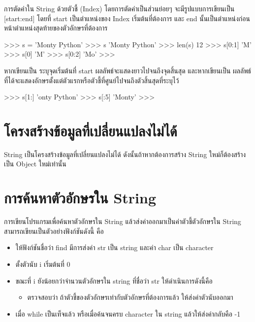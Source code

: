 การตัดคำใน String ด้วยตัวชี้ (Index) โดยการตัดคำเป็นส่วนย่อยๆ จะมีรูปแบบการเขียนเป็น [start:end] โดยที่ start เป็นตำแหน่งของ Index เริ่มต้นที่ต้องการ และ end นั้นเป็นตำแหน่งก่อนหน้าตำแหน่งสุดท้ายของตัวอักษรที่ต้องการ

\begin{codelist}{}{}
>>> s = 'Monty Python'
>>> s
'Monty Python'
>>> len(s)
12
>>> s[0:1]
'M'
>>> s[0]
'M'
>>> s[0:2]
'Mo'
>>>
\end{codelist}


หากเขียนเป็น  \pyinline{[start:]} ระบุจุดเริ่มต้นที่ start ผลลัพธ์จะแสดงยาวไปจนถึงจุดสิ้นสุด และหากเขียนเป็น  \pyinline{[:end]} ผลลัพธ์ที่ได้จะแสดงอักษรตั้งแต่ตัวแรกหรือตัวชี้ที่ศูนย์ไปจนถึงตัวสิ้นสุดที่ระบุไว้

\begin{codelist}{}{}
>>> s[1:]
'onty Python'
>>> s[:5]
'Monty'
>>>
\end{codelist}


\section{โครงสร้างข้อมูลที่เปลี่ยนแปลงไม่ได้}

String เป็นโครงสร้างข้อมูลที่เปลี่ยนแปลงไม่ได้ ดังนั้นถ้าหากต้องการสร้าง String ใหม่ก็ต้องสร้างเป็น Object ใหม่เท่านั้น



\section{การค้นหาตัวอักษรใน String}

การเขียนโปรแกรมเพื่อค้นหาตัวอักษรใน String แล้วส่งค่าออกมาเป็นค่าตัวชี้ตัวอักษรใน String สามารถเขียนเป็นตัวอย่างฟังก์ชันดังนี้ คือ 

\begin{itemize}
\item ให้ฟังก์ชันชื่อว่า find มีการส่งค่า str เป็น string และค่า char เป็น character 
\item ตั้งตัวนับ i เริ่มต้นที่ 0
\item ขณะที่ i ยังน้อยกว่าจำนวนตัวอักษรใน string ที่ชื่อว่า str ให้ดำเนินการดังนี้คือ
	\begin{itemize}
		\item ตรวจสอบว่า ถ้าตัวชี้ของตัวอักษรเท่ากับตัวอักษรที่ต้องการแล้ว ให้ส่งค่าตัวนับออกมา
	\end{itemize}
\item เมื่อ while เป็นเท็จแล้ว หรือเมื่อค้นจนครบ character ใน string แล้วให้ส่งค่ากลับคือ -1
\end{itemize}

